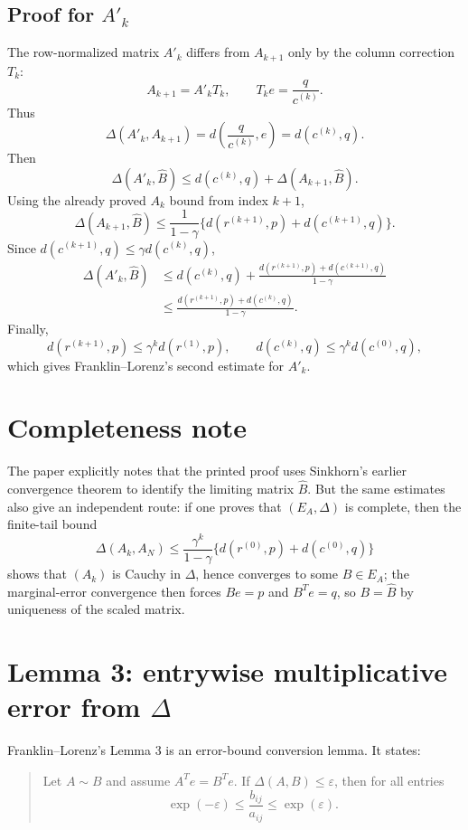 \subsection*{Proof for $A'_k$}
The row-normalized matrix $A'_k$ differs from $A_{k+1}$ only by the column correction
$T_k$:
\[
  A_{k+1}=A'_kT_k,
  \qquad
  T_ke=\frac{q}{c^{(k)}}.
\]
Thus
\[
  \Delta(A'_k,A_{k+1})=d\left(\frac{q}{c^{(k)}},e\right)=d(c^{(k)},q).
\]
Then
\[
  \Delta(A'_k,\widehat B)
  \le d(c^{(k)},q)+\Delta(A_{k+1},\widehat B).
\]
Using the already proved $A_k$ bound from index $k+1$,
\[
  \Delta(A_{k+1},\widehat B)
  \le \frac{1}{1-\gamma}
      \{d(r^{(k+1)},p)+d(c^{(k+1)},q)\}.
\]
Since $d(c^{(k+1)},q)\le \gamma d(c^{(k)},q)$,
\begin{align*}
  \Delta(A'_k,\widehat B)
  &\le d(c^{(k)},q)
      +\frac{d(r^{(k+1)},p)+d(c^{(k+1)},q)}{1-\gamma}\\
  &\le \frac{d(r^{(k+1)},p)+d(c^{(k)},q)}{1-\gamma}.
\end{align*}
Finally,
\[
  d(r^{(k+1)},p)\le \gamma^k d(r^{(1)},p),
  \qquad
  d(c^{(k)},q)\le \gamma^k d(c^{(0)},q),
\]
which gives Franklin--Lorenz's second estimate for $A'_k$.

\section*{Completeness note}
The paper explicitly notes that the printed proof uses Sinkhorn's earlier convergence
theorem to identify the limiting matrix $\widehat B$.  But the same estimates also give
an independent route: if one proves that $(E_A,\Delta)$ is complete, then the finite-tail
bound
\[
  \Delta(A_k,A_N)\le
  \frac{\gamma^k}{1-\gamma}
  \{d(r^{(0)},p)+d(c^{(0)},q)\}
\]
shows that $(A_k)$ is Cauchy in $\Delta$, hence converges to some $B\in E_A$; the
marginal-error convergence then forces $Be=p$ and $B^Te=q$, so $B=\widehat B$ by
uniqueness of the scaled matrix.

\section*{Lemma 3: entrywise multiplicative error from $\Delta$}
Franklin--Lorenz's Lemma 3 is an error-bound conversion lemma.  It states:

\begin{quote}
Let $A\sim B$ and assume $A^Te=B^Te$.  If $\Delta(A,B)\le \varepsilon$, then for all
entries
\[
  \exp(-\varepsilon)\le \frac{b_{ij}}{a_{ij}}\le \exp(\varepsilon).
\]
\end{quote}

